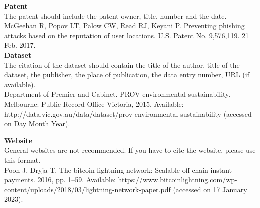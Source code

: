 \documentclass{ELSP}
\begin{document}
\noindent \textbf{Patent}\\
\noindent The patent should include the patent owner, title, number and the date. \\
\noindent [1] McGeehan R, Popov LT, Palow CW, Read RJ, Keyani P. Preventing phishing attacks based on the reputation of user locations. U.S. Patent No. 9,576,119. 21 Feb. 2017. 
\\

\noindent \textbf{Dataset}\\
\noindent The citation of the dataset should contain the title of the author. title of the dataset, the publisher, the place of publication, the data entry number, URL (if available). \\
\noindent [1] Department of Premier and Cabinet. PROV environmental sustainability. Melbourne: Public Record Office Victoria, 2015. Available: http://data.vic.gov.au/data/dataset/prov-environmental-sustainability (accessed on Day Month Year).

\noindent \textbf{Website}\\
\noindent General websites are not recommended. If you have to cite the website, please use this format. \\
\noindent [1] Poon J, Dryja T. The bitcoin lightning network: Scalable off-chain instant payments. 2016, pp. 1--59. Available: https://www.bitcoinlightning.com/wp-content/uploads/2018/03/lightning-network-paper.pdf (accessed on 17 January 2023).


%
%
\end{document}
